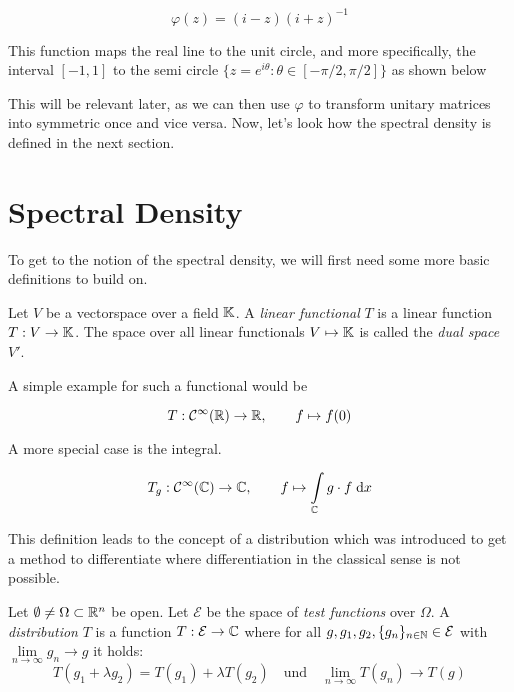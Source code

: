 $$\varphi(z) = (i-z)(i+z)^{-1}$$

This function maps the real line to the unit circle, and more specifically, the interval $[-1, 1]$ to the semi circle
$\{z = e^{i\theta}: \theta \in [-\pi/2,\pi/2]\}$ as shown below

\vspace{0.5cm}



This will be relevant later, as we can then use $\varphi$ to transform unitary matrices into symmetric once and vice versa.
Now, let's look how the spectral density is defined in the next section.

\section{Spectral Density}

To get to the notion of the spectral density, we will first need some more basic definitions to build on.

\begin{definition}
    Let $V$ be a vectorspace over a field $\mathbb{K}$. A \emph{linear functional} $T$ is a linear function $T: V \to \mathbb{K}$.
    The space over all linear functionals $V \mapsto \mathbb{K}$ is called the \emph{dual space} $V'$.
\end{definition}

A simple example for such a functional would be

\begin{equation} \label{eq:functional_example_simple}
    T: \mathcal{C}^{\infty}(\mathbb{R}) \to \mathbb{R}, \qquad f \mapsto f(0)
\end{equation}

A more special case is the integral.

\begin{equation} \label{eq:functional_example_integral}
    T_g: \mathcal{C}^{\infty}(\mathbb{C}) \to \mathbb{C}, \qquad f \mapsto \int\limits_{\mathbb{C}} g \cdot f \;\mathrm{d}x
\end{equation}

This definition leads to the concept of a distribution which was introduced to get a method to differentiate where differentiation in the classical sense is not possible.

\begin{definition}[distribution]
    Let $\emptyset \neq \Omega \subset \mathbb{R}^n$ be open.
    Let $\mathcal{E}$ be the space of \emph{test functions} over $\Omega$.
    A \emph{distribution} $T$ is a function $T: \mathcal{E} \to \mathbb{C}$ where for all
    $g, g_1, g_2, \{g_n\}_{n \in \mathbb{N}} \in \mathcal{E}$
    with $\lim\limits_{n \to \infty} g_n \to g$ it holds:
    $$T(g_1 + \lambda g_2) = T(g_1) + \lambda T(g_2) \quad \text{und}\quad \lim\limits_{n \to \infty} T(g_n) \to T(g)$$
\end{definition}


